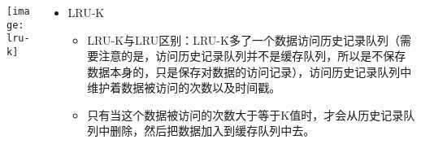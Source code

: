 \begin{frame}[plain]
	\frametitle{ }
	\begin{columns}
		\begin{column}{.4\textwidth}
			\centering
			\texttt{[image: lru-k]}
		\end{column}
		
		\begin{column}{.6\textwidth}
			
			\begin{itemize}
				\item LRU-K
				\begin{itemize}
					
					\item LRU-K与LRU区别：LRU-K多了一个数据访问历史记录队列（需要注意的是，访问历史记录队列并不是缓存队列，所以是不保存数据本身的，只是保存对数据的访问记录），访问历史记录队列中维护着数据被访问的次数以及时间戳。
					\item 只有当这个数据被访问的次数大于等于K值时，才会从历史记录队列中删除，然后把数据加入到缓存队列中去。
					
				\end{itemize}
			\end{itemize}
			
			
		\end{column}
		
		
	\end{columns}
\end{frame}

